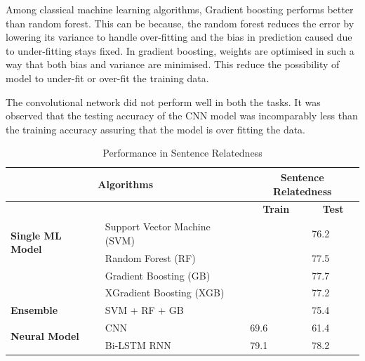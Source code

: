 \documentclass[12pt]{report} %
\begin{document}
 Among classical machine learning algorithms, Gradient boosting performs better than random forest. This can be because, the random forest reduces the error by lowering its variance to handle over-fitting and the bias in prediction caused due to under-fitting stays fixed. In gradient boosting, weights are optimised in such a way that both bias and variance are minimised. This reduce the possibility of model to under-fit or over-fit the training data.

The convolutional network did not perform well in both the tasks. It was observed that the testing accuracy of the CNN model was incomparably less than the training accuracy assuring that the model is over fitting the data.


\begin{table}[]
	\centering
	\caption{Performance in Sentence Relatedness}
	\label{sr_perf}
	\begin{tabular}{|l|l|l|l|}
		\hline
		\multicolumn{2}{|c|}{\textbf{Algorithms}}                                     & \multicolumn{2}{c|}{\textbf{Sentence Relatedness}}                       \\ \hline
		&                              & \multicolumn{1}{c|}{\textbf{Train}} & \multicolumn{1}{c|}{\textbf{Test}} \\ \hline
		\multirow{2}{*}{\textbf{Single ML Model}} & Support Vector Machine (SVM) &                                     & 76.2                               \\ \cline{2-4}
		& Random Forest (RF)           &                                     & 77.5                               \\ \cline{2-4}
		& Gradient Boosting (GB)       &                                 & 77.7                               \\ \cline{2-4}
		\textbf{}                                      & XGradient Boosting (XGB)     &                                     & 77.2                               \\ \hline
		\textbf{Ensemble}                              & SVM + RF + GB                &                                     & 75.4                               \\ \hline
		\multirow{2}{*}{\textbf{Neural Model}}         & CNN                          & 69.6                                & 61.4                               \\ \cline{2-4} 
		& Bi-LSTM RNN                  & 79.1                            & 78.2                               \\ \hline
	\end{tabular}
\end{table}
\end{document}
